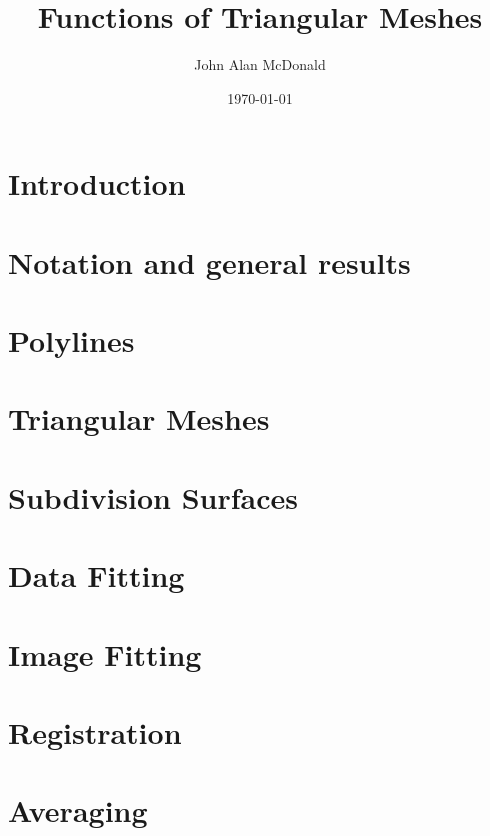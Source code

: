 \documentclass{article}
\begin{document}


\title{Functions of Triangular Meshes}
\author{ \sc John Alan McDonald }
\date{\today}
\maketitle

% 
\cleardoublepage

\tableofcontents
\listoffigures

\cleardoublepage

\section{Introduction}


\section{Notation and general results}



\section{Polylines}


\section{Triangular Meshes}




\section{Subdivision Surfaces}



\section{Data Fitting}


\section{Image Fitting}


\section{Registration}


\section{Averaging}


\newpage
{\small


}
\end{document}
